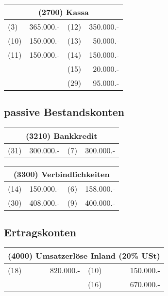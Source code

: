 \documentclass[parskip=half,12pt,a4paper]{scrartcl}
\begin{document}
\begin{center}
	\begin{tabular}{lr|lr}
		\multicolumn{4}{c}{(2700) Kassa}\\
		\toprule
		(3) & 365.000.- & (12) & 350.000.-\\
		(10) & 150.000.- & (13) & 50.000.-\\
		(11) & 150.000.- & (14) & 150.000.-\\
		& & (15) & 20.000.-\\
		& & (29) & 95.000.-\\
		\bottomrule
	\end{tabular}
\end{center}

\subsection{passive Bestandskonten}

\begin{center}
	\begin{tabular}{lr|lr}
		\multicolumn{4}{c}{(3210) Bankkredit}\\
		\toprule
		(31) & 300.000.- & (7) & 300.000.-\\
		\bottomrule
	\end{tabular}
\end{center}

\begin{center}
	\begin{tabular}{lr|lr}
		\multicolumn{4}{c}{(3300) Verbindlichkeiten}\\
		\toprule
		(14) & 150.000.- & (6) & 158.000.-\\
		(30) & 408.000.- & (9) & 400.000.-\\
		\bottomrule
	\end{tabular}
\end{center}

\subsection{Ertragskonten}

\begin{center}
	\begin{tabular}{lr|lr}
		\multicolumn{4}{c}{(4000) Umsatzerlöse Inland (20\% USt)}\\
		\toprule
		(18) & 820.000.- & (10) & 150.000.-\\
		& & (16) & 670.000.-\\
		\bottomrule
	\end{tabular}
\end{center}
\end{document}
